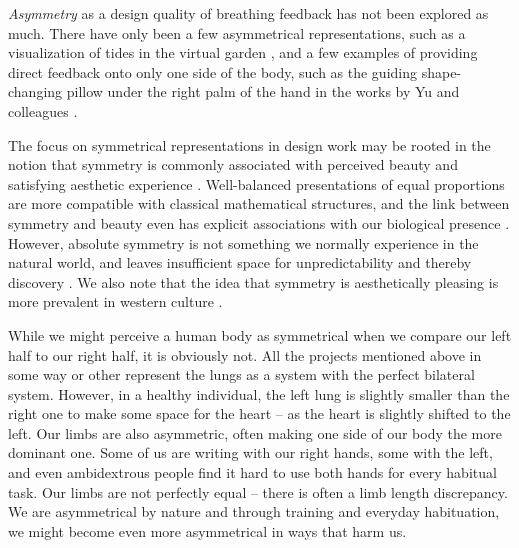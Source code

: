  \textit{Asymmetry} as a design quality of breathing feedback has not been explored as much. There have only been a few asymmetrical representations, such as a visualization of tides in the virtual garden \cite{roo_inner_2017}, and a few examples of providing direct feedback onto only one side of the body, such as the guiding shape-changing pillow under the right palm of the hand in the works by Yu and colleagues \cite{yu_breathe_2015}.

The focus on symmetrical representations in design work may be rooted in the notion that symmetry is commonly associated with perceived beauty and satisfying aesthetic experience \cite{nadal_study_2020, mcmanus_symmetry_2005}. Well-balanced presentations of equal proportions are more compatible with classical mathematical structures, and the link between symmetry and beauty even has explicit associations with our biological presence \cite{cardenas_symmetrical_2006}. However, absolute symmetry is not something we normally experience in the natural world, and leaves insufficient space for unpredictability and thereby discovery \cite{mcmanus_symmetry_2005}. We also note that the idea that symmetry is aesthetically pleasing is more prevalent in western culture \cite{nadal_study_2020, zeki_clive_2013}.

While we might perceive a human body as symmetrical when we compare our left half to our right half, it is obviously not. All the projects mentioned above in some way or other represent the lungs as a system with the perfect bilateral system. However, in a healthy individual, the left lung is slightly smaller than the right one to make some space for the heart -- as the heart is slightly shifted to the left. Our limbs are also asymmetric, often making one side of our body the more dominant one. Some of us are writing with our right hands, some with the left, and even ambidextrous people find it hard to use both hands for every habitual task. Our limbs are not perfectly equal -- there is often a limb length discrepancy. We are asymmetrical by nature and through training and everyday habituation, we might become even more asymmetrical in ways that harm us.


